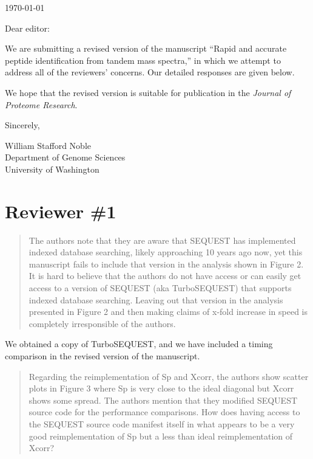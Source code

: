 \documentclass{article}
\newcommand{\breview}{\begin{quotation}\begin{em}\noindent}
\newcommand{\ereview}{\end{em}\end{quotation}}
\begin{document}
\hspace*{3.0in}\today

\vspace*{3ex}

\noindent
Dear editor:

\vspace*{1ex}

We are submitting a revised version of the manuscript ``Rapid and
accurate peptide identification from tandem mass spectra,'' in which
we attempt to address all of the reviewers' concerns.  Our detailed
responses are given below.

We hope that the revised version is suitable for publication in the {\em
Journal of Proteome Research}.

\vspace*{1ex}

\noindent
Sincerely,

\hspace*{1ex}

\noindent
William Stafford Noble\\
Department of Genome Sciences\\
University of Washington


\section*{Reviewer \#1}

\breview The authors note that they are aware that SEQUEST has
implemented indexed database searching, likely approaching 10 years
ago now, yet this manuscript fails to include that version in the
analysis shown in Figure 2.  It is hard to believe that the authors do
not have access or can easily get access to a version of SEQUEST (aka
TurboSEQUEST) that supports indexed database searching.  Leaving out
that version in the analysis presented in Figure 2 and then making
claims of x-fold increase in speed is completely irresponsible of the
authors. \ereview

We obtained a copy of TurboSEQUEST, and we have included a timing
comparison in the revised version of the manuscript.

\breview Regarding the reimplementation of Sp and Xcorr, the authors
show scatter plots in Figure 3 where Sp is very close to the ideal
diagonal but Xcorr shows some spread.  The authors mention that they
modified SEQUEST source code for the performance comparisons.  How
does having access to the SEQUEST source code manifest itself in what
appears to be a very good reimplementation of Sp but a less than ideal
reimplementation of Xcorr? \ereview
\end{document}
